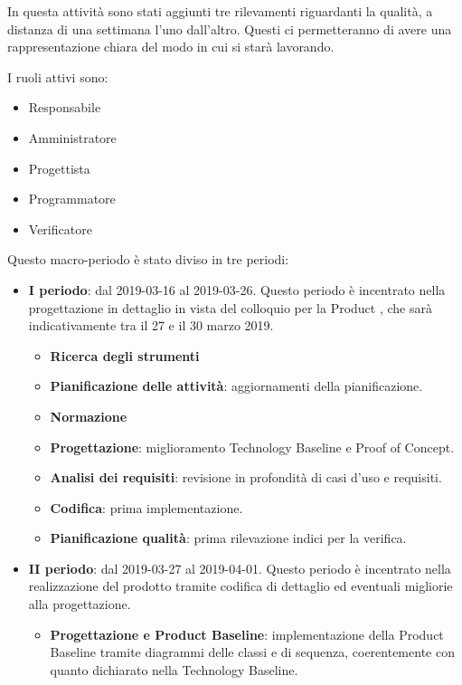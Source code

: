 		In questa attività sono stati aggiunti tre rilevamenti riguardanti la qualità, a distanza di una settimana l'uno
		dall'altro. Questi ci permetteranno di avere una rappresentazione chiara del modo in cui si starà lavorando.

        I ruoli attivi sono:
        \begin{itemize}
            \item Responsabile
            \item Amministratore
            \item Progettista
            \item Programmatore
            \item Verificatore
        \end{itemize}
        Questo macro-periodo è stato diviso in tre periodi:
		\begin{itemize}
			\item \textbf{I periodo}: dal 2019-03-16 al 2019-03-26. Questo periodo è incentrato nella progettazione in dettaglio
				in vista del colloquio per la Product , che sarà indicativamente tra il 27 e il 30 marzo 2019.
			\begin{itemize}
    	        \item \textbf{Ricerca degli strumenti}
    	        \item \textbf{Pianificazione delle attività}: aggiornamenti della pianificazione.
    	        \item \textbf{Normazione}
    	        \item \textbf{Progettazione}: miglioramento Technology Baseline e Proof of Concept.
                \item \textbf{Analisi dei requisiti}: revisione in profondità di casi d'uso e requisiti.
    	        \item \textbf{Codifica}: prima implementazione.
    	        \item \textbf{Pianificazione qualità}: prima rilevazione indici per la verifica.
        	\end{itemize}
			\item \textbf{II periodo}: dal 2019-03-27 al 2019-04-01. Questo periodo è incentrato nella realizzazione del prodotto tramite
				codifica di dettaglio ed eventuali migliorie alla progettazione.
			\begin{itemize}
				\item \textbf{Progettazione e Product Baseline}: implementazione della Product Baseline tramite diagrammi delle
				classi e di sequenza, coerentemente con quanto dichiarato nella Technology Baseline.

\end{itemize}
\end{itemize}
